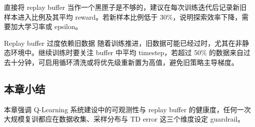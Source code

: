 直接将 replay buffer 当作一个黑匣子是不够的，建议在每次训练迭代后记录新旧样本进入比例及其平均 reward。若新样本比例低于 30\%，说明探索效率下降，需要加大学习率或 epsilon。

\begin{warningbox}{Replay buffer 过度依赖旧数据}
随着训练推进，旧数据可能已经过时，尤其在非静态环境中。继续训练时要关注 buffer 中平均 timestep，若超过 50\% 的数据来自过去十分钟，可启用循环清洗或将优先级重新置为高值，避免旧策略主导梯度。
\end{warningbox}

\subsection{本章小结}

本章强调 Q-Learning 系统建设中的可观测性与 replay buffer 的健康度，任何一次大规模复训都应在数据收集、采样分布与 TD error 这三个维度设定 guardrail。

